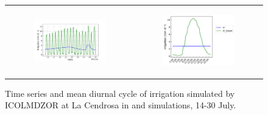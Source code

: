 \begin{figure}[hbtp]
    \centering
    \begin{tabular}{cc}
        \begin{subfigure}[t]{0.5\textwidth}
            \caption{}
            \includegraphics[width=\textwidth]{images/chap6/SOP_TS_DC/time_series_cendrosa_irrigation.png}
        \end{subfigure} &
        \begin{subfigure}[t]{0.5\textwidth}
            \caption{}
            \includegraphics[width=\textwidth]{images/chap6/SOP_TS_DC/diurnal_cycle_cendrosa_irrigation.png}
        \end{subfigure}
    \end{tabular} 
    \caption{Time series and mean diurnal cycle  of irrigation simulated by ICOLMDZOR at La Cendrosa in \irr and \irrboost simulations, 14-30 July.}
    \label{fig:sop_irrigation_orchidee}
\end{figure}

